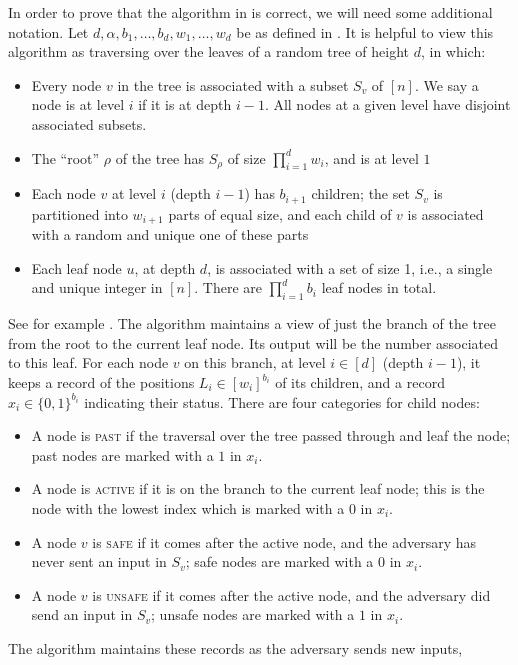 \documentclass[10pt,a4paper]{article}
\theoremstyle{definition}
\theoremstyle{remark}
\begin{document}
\begin{itemize}
\begin{itemize}
In order to prove that the algorithm in  is correct, we will need some additional notation. Let $d,\alpha,b_1,\ldots,b_d,w_1,\ldots,w_d$ be
as defined in . It is helpful to view this algorithm as traversing over the leaves of a random tree of height $d$, in which:
\begin{itemize}
  \item Every node $v$ in the tree is associated with a subset $S_v$ of $[n]$. We say a node is at level $i$ if it is at depth $i - 1$. All nodes at a given level have disjoint associated subsets.
  \item The ``root'' $\rho$ of the tree has $S_\rho$ of size $\prod_{i=1}^{d} w_i$, and is at level $1$
  \item Each node $v$ at level $i$ (depth $i-1$) has $b_{i+1}$ children; the set $S_v$ is partitioned into $w_{i+1}$ parts of equal size, and each child of $v$ is associated with a random and unique one of these parts
  \item Each leaf node $u$, at depth $d$, is associated with a set of size 1, i.e., a single and unique integer in $[n]$. There are $\prod_{i=1}^{d} b_i$ leaf nodes in total.
\end{itemize}
See for example . The algorithm maintains a view of just the branch of the tree from the root to the current leaf node. Its output will be the number associated to this leaf. For each node $v$ on this branch, at level $i \in [d]$ (depth $i-1$), it keeps a record of the positions $L_i \in [w_i]^{b_i}$ of its children, and a record $x_i \in \{0,1\}^{b_i}$ indicating their status. There are four categories for child nodes:
\begin{itemize}
\item A node is \textsc{past} if the traversal over the tree passed through and leaf the node; past nodes are marked with a $1$ in $x_i$.
\item A node is \textsc{active} if it is on the branch to the current leaf node; this is the node with the lowest index which is marked with a $0$ in $x_i$.
\item A node $v$ is \textsc{safe} if it comes after the active node, and the adversary has never sent an input in $S_v$; safe nodes are marked with a $0$ in $x_i$.
\item A node $v$ is \textsc{unsafe} if it comes after the active node, and the adversary did send an input in $S_v$; unsafe nodes are marked with a $1$ in $x_i$.
\end{itemize}
The algorithm maintains these records as the adversary sends new inputs,

\end{itemize}
\end{itemize}
\end{document}
